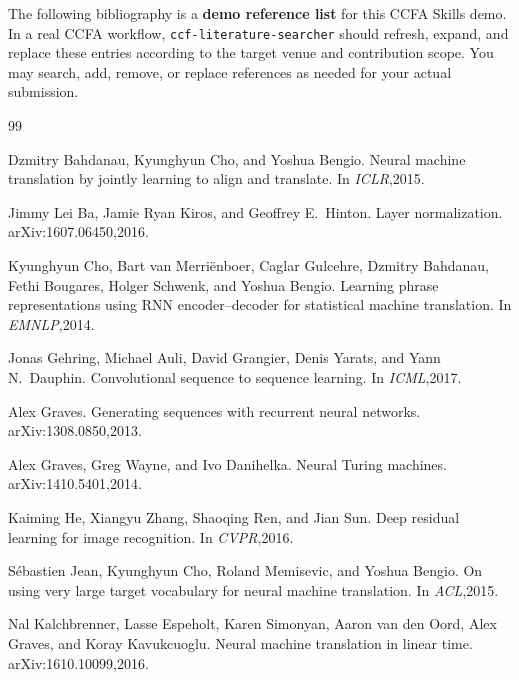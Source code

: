﻿\documentclass{article}
\begin{document}
The following bibliography is a \textbf{demo reference list} for this CCFA Skills demo. In a real CCFA workflow, \texttt{ccf-literature-searcher} should refresh, expand, and replace these entries according to the target venue and contribution scope. You may search, add, remove, or replace references as needed for your actual submission.

\begin{thebibliography}{99}

Dzmitry Bahdanau, Kyunghyun Cho, and Yoshua Bengio.
\newblock Neural machine translation by jointly learning to align and translate.
\newblock In \emph{ICLR},2015.

Jimmy Lei Ba, Jamie Ryan Kiros, and Geoffrey E.\ Hinton.
\newblock Layer normalization.
\newblock arXiv:1607.06450,2016.

Kyunghyun Cho, Bart van Merri{\"e}nboer, Caglar Gulcehre, Dzmitry Bahdanau, Fethi Bougares, Holger Schwenk, and Yoshua Bengio.
\newblock Learning phrase representations using RNN encoder--decoder for statistical machine translation.
\newblock In \emph{EMNLP},2014.

Jonas Gehring, Michael Auli, David Grangier, Denis Yarats, and Yann N.\ Dauphin.
\newblock Convolutional sequence to sequence learning.
\newblock In \emph{ICML},2017.

Alex Graves.
\newblock Generating sequences with recurrent neural networks.
\newblock arXiv:1308.0850,2013.

Alex Graves, Greg Wayne, and Ivo Danihelka.
\newblock Neural Turing machines.
\newblock arXiv:1410.5401,2014.

Kaiming He, Xiangyu Zhang, Shaoqing Ren, and Jian Sun.
\newblock Deep residual learning for image recognition.
\newblock In \emph{CVPR},2016.

S{\'e}bastien Jean, Kyunghyun Cho, Roland Memisevic, and Yoshua Bengio.
\newblock On using very large target vocabulary for neural machine translation.
\newblock In \emph{ACL},2015.

Nal Kalchbrenner, Lasse Espeholt, Karen Simonyan, Aaron van den Oord, Alex Graves, and Koray Kavukcuoglu.
\newblock Neural machine translation in linear time.
\newblock arXiv:1610.10099,2016.


\end{thebibliography}
\end{document}

